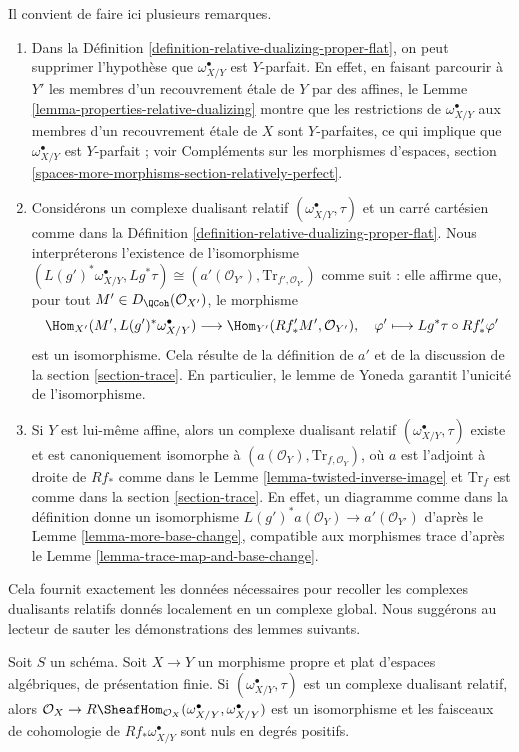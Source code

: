 \noindent
Il convient de faire ici plusieurs remarques.
\begin{enumerate}
\item Dans la Définition \ref{definition-relative-dualizing-proper-flat},
on peut supprimer l'hypothèse que $\omega_{X/Y}^\bullet$ est $Y$-parfait.
En effet, en faisant parcourir à $Y'$ les membres d'un recouvrement \'etale de $Y$
par des affines, le Lemme \ref{lemma-properties-relative-dualizing} montre
que les restrictions de $\omega_{X/Y}^\bullet$ aux membres d'un
recouvrement \'etale de $X$ sont $Y$-parfaites, ce qui implique que
$\omega_{X/Y}^\bullet$ est $Y$-parfait ; voir
Compléments sur les morphismes d'espaces, section
\ref{spaces-more-morphisms-section-relatively-perfect}.
\item Considérons un complexe dualisant relatif
$(\omega_{X/Y}^\bullet, \tau)$ et un carré cartésien comme dans la
Définition \ref{definition-relative-dualizing-proper-flat}.
Nous interpréterons l'existence de l'isomorphisme
$(L(g')^*\omega_{X/Y}^\bullet, Lg^*\tau) \cong
(a'(\mathcal{O}_{Y'}), \text{Tr}_{f', \mathcal{O}_{Y'}})$
comme suit : elle affirme que, pour tout $M' \in D_\QCoh(\mathcal{O}_{X'})$,
le morphisme
$$
\Hom_{X'}(M', L(g')^*\omega_{X/Y}^\bullet)
\longrightarrow
\Hom_{Y'}(Rf'_*M', \mathcal{O}_{Y'}),\quad
\varphi' \longmapsto Lg^*\tau \circ Rf'_*\varphi'
$$
est un isomorphisme. Cela résulte de la définition de $a'$
et de la discussion de la section \ref{section-trace}. En particulier,
le lemme de Yoneda garantit l'unicité de l'isomorphisme.
\item Si $Y$ est lui-même affine, alors un complexe dualisant relatif
$(\omega_{X/Y}^\bullet, \tau)$ existe et est canoniquement isomorphe
à $(a(\mathcal{O}_Y), \text{Tr}_{f, \mathcal{O}_Y})$, où
$a$ est l'adjoint à droite de $Rf_*$ comme dans le
Lemme \ref{lemma-twisted-inverse-image}
et $\text{Tr}_f$ est comme dans la section \ref{section-trace}.
En effet, un diagramme comme dans la définition donne
un isomorphisme $L(g')^*a(\mathcal{O}_Y) \to a'(\mathcal{O}_{Y'})$ d'après le
Lemme \ref{lemma-more-base-change},
compatible aux morphismes trace d'après le
Lemme \ref{lemma-trace-map-and-base-change}.
\end{enumerate}
Cela fournit exactement les données nécessaires pour recoller les
complexes dualisants relatifs donnés localement en un complexe global. Nous suggérons au lecteur
de sauter les démonstrations des lemmes suivants.

\begin{lemma}
\label{lemma-relative-dualizing-RHom}
Soit $S$ un schéma. Soit $X \to Y$ un morphisme propre et plat
d'espaces algébriques, de présentation finie.
Si $(\omega_{X/Y}^\bullet, \tau)$ est un complexe dualisant relatif,
alors $\mathcal{O}_X \to
R\SheafHom_{\mathcal{O}_X}(\omega_{X/Y}^\bullet, \omega_{X/Y}^\bullet)$
est un isomorphisme et les faisceaux de cohomologie de $Rf_*\omega_{X/Y}^\bullet$
sont nuls en degrés positifs.
\end{lemma}

